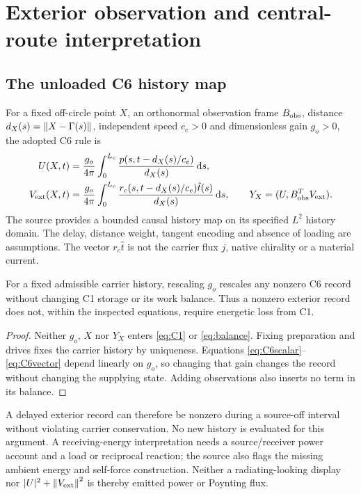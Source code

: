 \section{Exterior observation and central-route interpretation}\label{sec:interpretation}
\subsection{The unloaded C6 history map}\label{sec:C6}
For a fixed off-circle point $X$, an orthonormal observation frame $B_{\rm obs}$, distance $d_X(s)=\left\|X-\Gamma(s)\right\|$, independent speed $c_e>0$ and dimensionless gain $g_o>0$, the adopted C6 rule is \cite[exterior section]{pairedII}
\begin{align}
 U(X,t)&=\frac{g_o}{4\pi}\int_0^{L_c}
       \frac{p(s,t-d_X(s)/c_e)}{d_X(s)}\,\mathrm d s,\label{eq:C6scalar}\\
 V_{\rm ext}(X,t)&=\frac{g_o}{4\pi}\int_0^{L_c}
       \frac{r_c(s,t-d_X(s)/c_e)\hat t(s)}{d_X(s)}\,\mathrm d s,\qquad
 Y_X=(U,B_{\rm obs}^TV_{\rm ext}).\label{eq:C6vector}
\end{align}
The source provides a bounded causal history map on its specified $L^2$ history domain. The delay, distance weight, tangent encoding and absence of loading are assumptions. The vector $r_c\hat t$ is not the carrier flux $j$, native chirality or a material current.

\begin{proposition}\label{prop:C6}
For a fixed admissible carrier history, rescaling $g_o$ rescales any nonzero C6 record without changing C1 storage or its work balance. Thus a nonzero exterior record does not, within the inspected equations, require energetic loss from C1.
\end{proposition}
\begin{proof}
Neither $g_o$, $X$ nor $Y_X$ enters \eqref{eq:C1} or \eqref{eq:balance}. Fixing preparation and drives fixes the carrier history by uniqueness. Equations \eqref{eq:C6scalar}--\eqref{eq:C6vector} depend linearly on $g_o$, so changing that gain changes the record without changing the supplying state. Adding observations also inserts no term in its balance.
\end{proof}
A delayed exterior record can therefore be nonzero during a source-off interval without violating carrier conservation. No new history is evaluated for this argument. A receiving-energy interpretation needs a source/receiver power account and a load or reciprocal reaction; the source also flags the missing ambient energy and self-force construction. Neither a radiating-looking display nor $|U|^2+\left\|V_{\rm ext}\right\|^2$ is thereby emitted power or Poynting flux.


